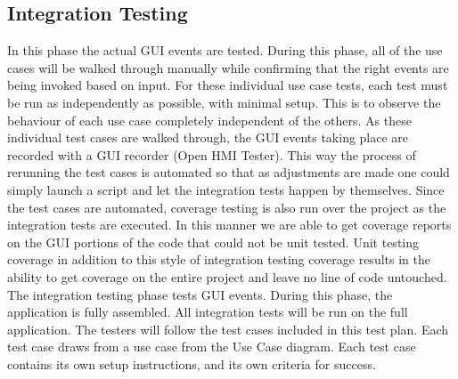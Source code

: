 \documentclass[twoside,letterpaper]{article}
\begin{document}
{\subsection{Integration Testing}
In this phase the actual GUI events are tested. During this phase, all of the use cases will be walked through manually while confirming that the right events are being invoked based on input. For these individual use case tests, each test must be run as independently as possible, with minimal setup. This is to observe the behaviour of each use case completely independent of the others.\newline
As these individual test cases are walked through, the GUI events taking place are recorded with a GUI recorder (Open HMI Tester). This way the process of rerunning the test cases is automated so that as adjustments are made one could simply launch a script and let the integration tests happen by themselves. Since the test cases are automated, coverage testing is also run over the project as the integration tests are executed. In this manner we are able to get coverage reports on the GUI portions of the code that could not be unit tested. Unit testing coverage in addition to this style of integration testing coverage results in the ability to get coverage on the entire project and leave no line of code untouched.\newline
The integration testing phase tests GUI events. During this phase, the application is fully assembled. All integration tests will be run on the full application. The testers will follow the test cases included in this test plan. Each test case draws from a use case from the Use Case diagram. Each test case contains its own setup instructions, and its own criteria for success.

}
\end{document}
